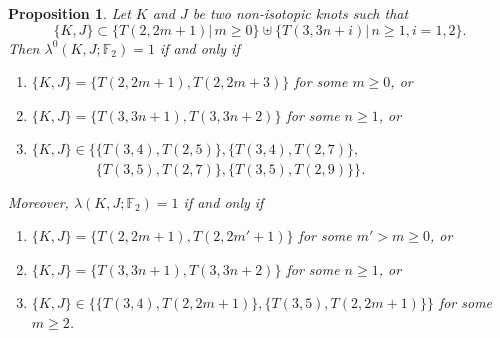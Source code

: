 \documentclass[11pt,a4paper,twoside]{amsart}
\newtheorem{proposition}[theorem]{Proposition}
\theoremstyle{definition}
\def\\{}%
\def\lambda{λ}%
\newcommand{\lambdau}{\lambda^0}
\newcommand{\F}{\mathbb{F}}
\begin{document}
\begin{proposition} \label{thm:pairs_torus_knots}
    Let \(K\) and \(J\) be two non-isotopic knots such that 
    \[
    \{ K,J \} 
    \subset 
    \{ T(2,2m+1)  \left|\, m \geq 0 \right.\} 
    \uplus 
    \{ T(3,3n+i)  \left|\, n \geq 1, i=1,2 \right.\}.
    \]
    Then
    \(\lambdau(K,J;\F_2)=1\) if and only if
    \begin{enumerate}[label=(\roman*)]
    	\item \label{item:pairs_torus_knots:1} \(\{ K,J \} = \{ T(2,2m+1), T(2,2m+3) \}\) for some \(m\geq 0\), or
    	\item \label{item:pairs_torus_knots:2} \(\{ K,J \} = \{ T(3,3n+1), T(3,3n+2) \}\) for some \(n\geq 1\), or
    	\item \label{item:pairs_torus_knots:3} \(\{ K,J \} \in \{\{ T(3,4), T(2,5) \}, \{ T(3,4), T(2,7) \},\)\\
    	\(\phantom{\{ K,J \} \in \{}	\{ T(3,5), T(2,7) \}, \{ T(3,5), T(2,9) \}\}\). 
    \end{enumerate}   
    Moreover, 
    \(\lambda(K,J;\F_2)=1\) if and only if
    \begin{enumerate}[label=(\roman*')]
    	\item \label{item:pairs_torus_knots:1'} \(\{ K,J \} = \{ T(2,2m+1), T(2,2m'+1) \}\) for some \(m'>m\geq 0\), or
    	\item \label{item:pairs_torus_knots:2'} \(\{ K,J \} = \{ T(3,3n+1), T(3,3n+2) \}\) for some \(n\geq 1\), or
    	\item \label{item:pairs_torus_knots:3'} \(\{ K,J \} \in \{\{ T(3,4), T(2,2m+1) \}, \{ T(3,5), T(2,2m+1) \}\}\)
    	for some \(m\geq 2\).
    \end{enumerate} 
\end{proposition}
\end{document}
